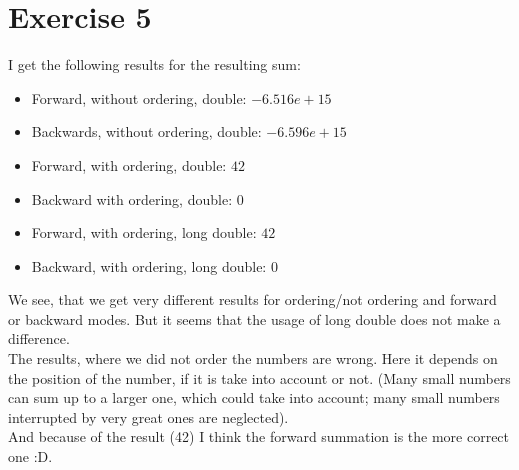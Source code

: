 \documentclass{scrartcl}
\begin{document}
	\section*{Exercise 5}
	I get the following results for the resulting sum:
	\begin{itemize}
		\item Forward, without ordering, double: $-6.516e+15$
		\item Backwards, without ordering, double: $-6.596e+15$
		\item Forward, with ordering, double: $42$
		\item Backward with ordering, double: $0$
		\item Forward, with ordering, long double: $42$
		\item Backward, with ordering, long double: $0$ 
	\end{itemize}
	We see, that we get very different results for ordering/not ordering and forward or backward modes. But it seems that the usage of long double does not make a difference.\\
	The results, where we did not order the numbers are wrong. Here it depends on the position of the number, if it is take into account or not. (Many small numbers can sum up to a larger one, which could take into account; many small numbers interrupted by very great ones are neglected).\\
	And because of the result (42) I think the forward summation is the more correct one :D.
	
	
\end{document}
